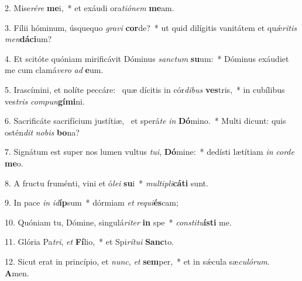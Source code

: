 2. Mise\textit{ré}\textit{re} \textbf{me}i,~*  et exáudi ora\textit{ti}\textit{ó}\textit{nem} \textbf{me}am.\

3. Fílii hóminum, úsquequo \textit{gra}\textit{vi} \textbf{cor}de?~*  ut quid dilígitis vanitátem et quǽ\textit{ri}\textit{tis} \textit{men}\textbf{dá}\textbf{ci}um?\

4. Et scitóte quóniam mirificávit Dóminus \textit{sanc}\textit{tum} \textbf{su}um:~*  Dóminus exáudiet me cum clamá\textit{ve}\textit{ro} \textit{ad} \textbf{e}um.\

5. Irascímini, et nolíte peccáre: \dag\  quæ dícitis in cór\textit{di}\textit{bus} \textbf{ves}tris,~*  in cubílibus ves\textit{tris} \textit{com}\textit{pun}\textbf{gí}\textbf{mi}ni.\

6. Sacrificáte sacrifícium justítiæ, \dag\  et sperá\textit{te} \textit{in} \textbf{Dó}mino.~*  Multi dicunt: quis ostén\textit{dit} \textit{no}\textit{bis} \textbf{bo}na?\

7. Signátum est super nos lumen vultus \textit{tu}\textit{i}, \textbf{Dó}mine:~*  dedísti lætítiam \textit{in} \textit{cor}\textit{de} \textbf{me}o.\

8. A fructu fruménti, vini et ó\textit{le}\textit{i} \textbf{su}i~*  \textit{mul}\textit{ti}\textit{pli}\textbf{cá}\textbf{ti} sunt.\

9. In pace \textit{in} \textit{id}\textbf{íp}sum~*  dórmiam \textit{et} \textit{re}\textit{qui}\textbf{és}cam;\

10. Quóniam tu, Dómine, singulá\textit{ri}\textit{ter} \textbf{in} spe~*  \textit{con}\textit{sti}\textit{tu}\textbf{ís}\textbf{ti} me.\

11. Glória Pa\textit{tri}, \textit{et} \textbf{Fí}lio,~*  et Spi\textit{rí}\textit{tu}\textit{i} \textbf{Sanc}to.\

12. Sicut erat in princípio, et \textit{nunc}, \textit{et} \textbf{sem}per,~*  et in sǽcula sæ\textit{cu}\textit{ló}\textit{rum}. \textbf{A}men.\


